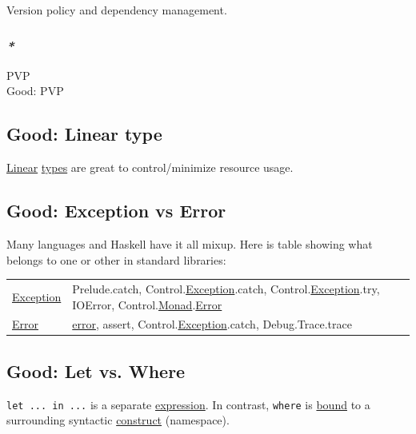 \documentclass[11pt]{article}
\begin{document}
Version policy and dependency management.\\

\begin{center}

\end{center}

\subsubsection{\emph{*}}
\label{sec:orgc3169ad}

\label{orgbd8426a}PVP\\
\label{org65f8bcd}Good: PVP\\

\subsection{\label{org2117a58}Good: Linear type}
\label{sec:org37b4e33}
\hyperref[orgbbe89e9]{Linear} \hyperref[org4209edd]{types} are great to control/minimize resource usage.\\

\subsection{\label{orgff17bd7}Good: Exception vs Error}
\label{sec:org6dd2c89}
Many languages and Haskell have it all mixup. Here is table showing what belongs to one or other in standard libraries:\\

\begin{center}
\begin{tabular}{ll}
\hline
\hyperref[org39ea709]{Exception} & Prelude.catch, Control.\hyperref[org39ea709]{Exception}.catch, Control.\hyperref[org39ea709]{Exception}.try, IOError, Control.\hyperref[org86a5d95]{Monad}.\hyperref[org2b27c5e]{Error}\\
\hyperref[org2b27c5e]{Error} & \hyperref[org2b27c5e]{error}, assert, Control.\hyperref[org39ea709]{Exception}.catch, Debug.Trace.trace\\
\end{tabular}
\end{center}

\subsection{\label{orgb7cebb2}Good: Let vs. Where}
\label{sec:orge997601}
\texttt{let ... in ...} is a separate \hyperref[org9021dd7]{expression}. In contrast, \texttt{where} is \hyperref[orgaac83d9]{bound} to a surrounding syntactic \hyperref[org3eb9b19]{construct} (namespace).\\
\end{document}

